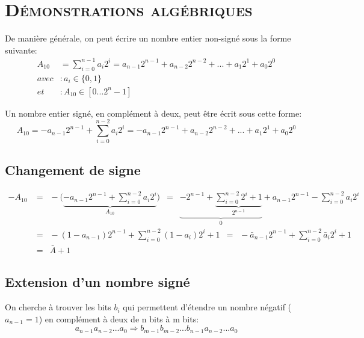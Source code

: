 \chapter{\textsc{Démonstrations algébriques}}
\label{ch:algebra}

De manière générale, on peut écrire un nombre entier non-signé sous la forme suivante:
\begin{equation}
\begin{aligned}
A_{10} &= \sum_{i=0}^{n-1} a_{i}2^{i} = a_{n-1}2^{n-1} + a_{n-2}2^{n-2} +...+ a_{1}2^{1} + a_{0}2^{0} \\
avec &:  a_{i} \in \{0,1\} \\
et &:   A_{10} \in [0...2^{n} - 1]
\end{aligned}
\end{equation}

Un nombre entier signé, en complément à deux, peut être écrit sous cette forme:
\begin{equation}
A_{10} = -a_{n-1}2^{n-1} + \sum_{i=0}^{n-2} a_{i}2^{i} = -a_{n-1}2^{n-1} + a_{n-2}2^{n-2} +...+ a_{1}2^{1} + a_{0}2^{0}
\end{equation}

\section{Changement de signe}

\begin{equation}
\begin{aligned}
-A_{10} &= \enspace - \Bigg( \underbrace{ -a_{n-1}2^{n-1} + \sum_{i=0}^{n-2} a_{i}2^{i}}_{A_{10}} \Bigg) \enspace = \enspace \underbrace{-2^{n-1} + \underbrace{\sum_{i=0}^{n-2} 2^{i} + 1}_{2^{n-1}}}_{0} + a_{n-1}2^{n-1} - \sum_{i=0}^{n-2} a_{i}2^{i} \\ &= \enspace -(1-a_{n-1})2^{n-1} + \sum_{i=0}^{n-2}(1-a_i)2^i + 1 \enspace = \enspace -\bar{a}_{n-1}2^{n-1} + \sum_{i=0}^{n-2} \bar{a}_{i}2^{i} + 1 \\ &= \enspace \bar{A} + 1
\end{aligned}
\end{equation}

\section{Extension d'un nombre signé}

On cherche à trouver les bits $b_i$ qui permettent d'étendre un nombre négatif ($a_{n-1}=1$) en complément à deux de n bits à m bits:
\[ a_{n-1} a_{n-2} ... a_{0} \Rightarrow b_{m-1} b_{m-2} ... b_{n-1} a_{n-2} ... a_{0} \]

